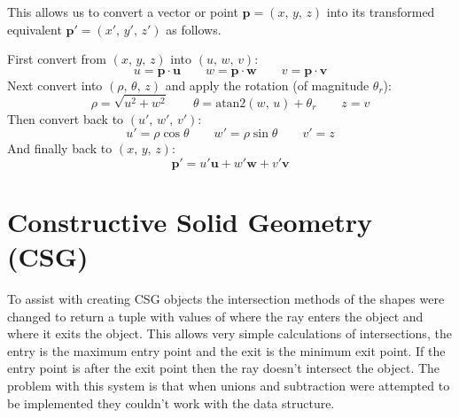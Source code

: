      This allows us to convert a vector or point $\mathbf{p} =
      \left(x,\,y,\,z\right)$ into its transformed equivalent $\mathbf{p}' =
      \left(x',\,y',\,z'\right)$ as follows.

      \noindent First convert from $\left(x,\,y,\,z\right)$ into $\left(u,\,w,\,v\right)$:
      \[ u = \mathbf{p} \cdot \mathbf{u} \qquad w = \mathbf{p} \cdot \mathbf{w}
         \qquad v = \mathbf{p} \cdot \mathbf{v} \]
      Next convert into $\left(\rho,\,\theta,\,z\right)$ and apply the rotation
      (of magnitude $\theta_r$):
      \[ \rho = \sqrt{u ^2 + w ^2} \qquad \theta =
      \textrm{atan2}\left(w,\,u\right) + \theta_r \qquad z = v \]
      Then convert back to $\left(u',\,w',\,v'\right)$:
      \[ u' = \rho\cos\theta \qquad w' = \rho\sin\theta \qquad v' = z \]
      And finally back to $\left(x,\,y,\,z\right)$:
      \[ \mathbf{p}' = u' \mathbf{u} + w' \mathbf{w} + v' \mathbf{v} \]

  \section{Constructive Solid Geometry (CSG)}
    To assist with creating CSG objects the intersection methods of the
    shapes were changed to return a tuple with values of where the ray enters
    the object and where it exits the object.  This allows very simple
    calculations of intersections, the entry is the maximum entry point and
    the exit is the minimum exit point.  If the entry point is after the exit
    point then the ray doesn't intersect the object.  The problem with this
    system is that when unions and subtraction were attempted to be
    implemented they couldn't work with the data structure.


